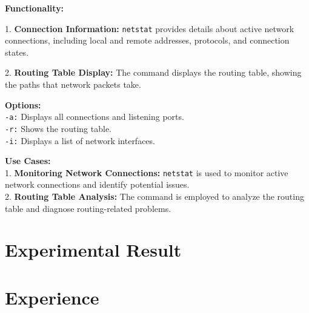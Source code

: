 \documentclass[11pt]{report}
\begin{document}
\textbf{Functionality:}

1. \textbf{Connection Information:} \texttt{netstat} provides details about active network connections, including local and remote addresses, protocols, and connection states.

2. \textbf{Routing Table Display:} The command displays the routing table, showing the paths that network packets take.

\vspace{\baselineskip}

\textbf{Options:} \\
\texttt{-a:} Displays all connections and listening ports.\\
\texttt{-r:} Shows the routing table.\\
\texttt{-i:} Displays a list of network interfaces.

\vspace{\baselineskip}

\textbf{Use Cases:} \\
1. \textbf{Monitoring Network Connections:} \texttt{netstat} is used to monitor active network connections and identify potential issues.\\
2. \textbf{Routing Table Analysis:} The command is employed to analyze the routing table and diagnose routing-related problems.


\section{Experimental Result}

\section{Experience}

\end{document}
